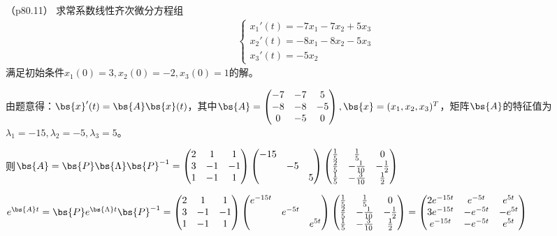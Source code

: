 \documentclass[12pt, a4paper, oneside, UTF8]{ctexbook}
\begin{document}
\begin{question}（p80.11）
    求常系数线性齐次微分方程组
    \begin{align*}
        \left\{
        \begin{array}{ll}
            x_1'(t)=-7x_1-7x_2+5x_3\\
            x_2'(t)=-8x_1-8x_2-5x_3\\
            x_3'(t)=-5x_2
        \end{array}
        \right.
    \end{align*}
    满足初始条件$x_1(0)=3,x_2(0)=-2,x_3(0)=1$的解。
\end{question}

\begin{solution}
    由题意得：$\bs{x}'(t)=\bs{A}\bs{x}(t)$，其中$\bs{A}=\begin{pmatrix}
        -7 & -7 & 5\\
        -8 &-8& -5 \\
        0 & -5 & 0
    \end{pmatrix},\bs{x}=(x_1,x_2,x_3)^T$，矩阵$\bs{A}$的特征值为$\lambda_1=-15,\lambda_2=-5,\lambda_3=5$。

    则$\bs{A}=\bs{P}\bs{\Lambda}\bs{P}^{-1}=\begin{pmatrix}
        2 & 1& 1\\
        3 &-1 &-1 \\
        1&-1&1
    \end{pmatrix} \begin{pmatrix}
        -15 & &\\
        & -5& \\
        & & 5
    \end{pmatrix} \begin{pmatrix}
        \frac{1}{5}& \frac{1}{5}&0\\
        \frac{2}{5}&-\frac{1}{10}&-\frac{1}{2}\\
        \frac{1}{5}&-\frac{3}{10}&\frac{1}{2}
    \end{pmatrix}$

    $e^{\bs{A}t}=\bs{P}e^{\bs{\Lambda}t}\bs{P}^{-1}
    =\begin{pmatrix}
        2 & 1& 1\\
        3 &-1 &-1 \\
        1&-1&1
    \end{pmatrix} \begin{pmatrix}
        e^{-15t} & &\\
        & e^{-5t}& \\
        & & e^{5t}
    \end{pmatrix} \begin{pmatrix}
        \frac{1}{5}& \frac{1}{5}&0\\
        \frac{2}{5}&-\frac{1}{10}&-\frac{1}{2}\\
        \frac{1}{5}&-\frac{3}{10}&\frac{1}{2}
    \end{pmatrix}
    =\begin{pmatrix}
        2e^{-15t} & e^{-5t} & e^{5t}\\
        3e^{-15t} & -e^{-5t} & -e^{5t}\\
        e^{-15t} & -e^{-5t} & e^{5t}
    \end{pmatrix}$


\end{solution}
\end{document}
